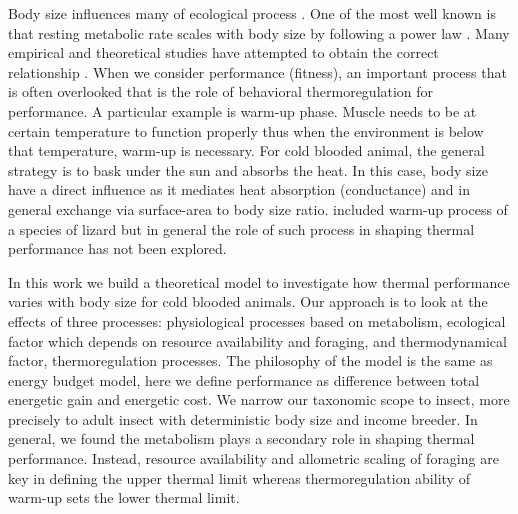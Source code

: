 Body size influences many of ecological process \citep{Peters1986}.
One of the most well known is that resting metabolic rate scales with body size by following a power law \citep{Kleiber1947, Peters1986, Brown2004}.
Many empirical and theoretical studies have attempted to obtain the correct relationship \citep{West1997, Kozlowski1997, Isaac2010}.
When we consider performance (fitness), an important process that is often overlooked that is the role of behavioral thermoregulation for performance. 
A particular example is warm-up phase. 
Muscle needs to be at certain temperature to function properly thus when the environment is below that temperature, warm-up is necessary. 
For cold blooded animal, the general strategy is to bask under the sun and absorbs the heat.
In this case, body size have a direct influence as it mediates heat absorption (conductance) and in general exchange via surface-area to body size ratio.
\citet{Buckley2008} included warm-up process of a species of lizard but in general the role of such process in shaping thermal performance has not been explored. 


In this work we build a theoretical model to investigate how thermal performance varies with body size for cold blooded animals.  %
Our approach is to look at the effects of three processes: physiological processes based on metabolism, ecological factor which depends on resource availability and foraging, and thermodynamical factor, thermoregulation processes.
The philosophy of the model is the same as energy budget model, here we define performance as difference between total energetic gain and energetic cost. %
We narrow our taxonomic scope to insect, more precisely to adult insect with deterministic body size and income breeder. 
In general, we found the metabolism plays a secondary role in shaping thermal performance.
Instead, resource availability and allometric scaling of foraging are key in defining the upper thermal limit whereas thermoregulation ability of warm-up sets the lower thermal limit.
